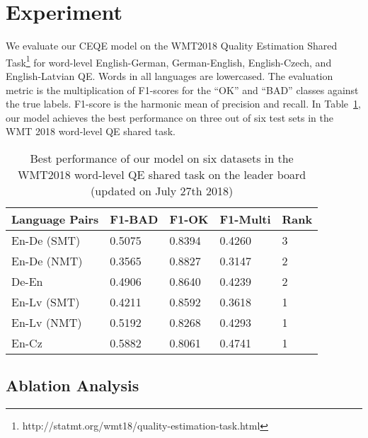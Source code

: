 \documentclass[11pt,a4paper]{article}
\begin{document}
\section{Experiment}
We evaluate our CEQE model on the WMT2018 Quality Estimation Shared Task\footnote{http://statmt.org/wmt18/quality-estimation-task.html} for word-level English-German, German-English, English-Czech, and English-Latvian QE. Words in all languages are lowercased. The evaluation metric is the multiplication of F1-scores for the ``OK'' and ``BAD'' classes against the true labels. F1-score is the harmonic mean of precision and recall. In Table~\ref{tab:leaderboard}, our model achieves the best performance on three out of six test sets in the WMT 2018 word-level QE shared task.

\begin{table}[htp]
\setlength\tabcolsep{3pt} 
\begin{tabular}{lllll} \hline
Language Pairs & F1-BAD & F1-OK & F1-Multi & Rank\\\hline
En-De (SMT) & 0.5075 & 0.8394 & 0.4260 & 3\\
En-De (NMT) & 0.3565 & 0.8827 & 0.3147 & 2\\
De-En & 0.4906 & 0.8640 & 0.4239 & 2\\
En-Lv (SMT) & 0.4211 & 0.8592 & 0.3618 & 1 \\
En-Lv (NMT) & 0.5192 & 0.8268 & 0.4293 & 1\\
En-Cz & 0.5882 & 0.8061 & 0.4741 & 1 \\\hline
\end{tabular}
\caption{Best performance of our model on six datasets in the WMT2018 word-level QE shared task on the leader board (updated on July 27th 2018) \label{tab:leaderboard}}
\end{table}

\subsection{Ablation Analysis}
\end{document}
